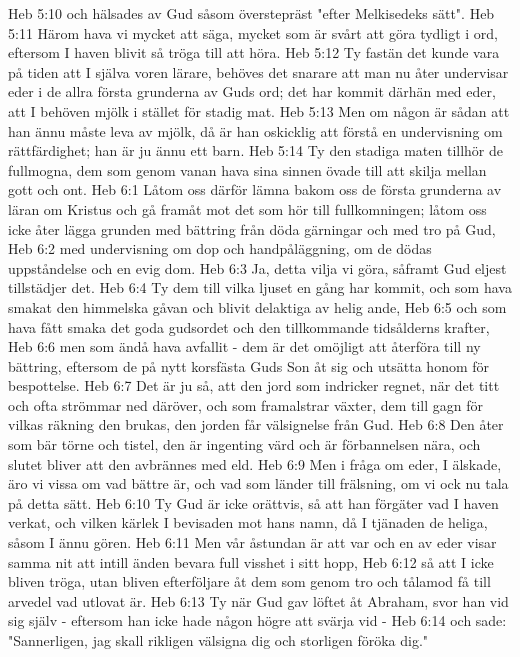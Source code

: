 Heb 5:10  och hälsades av Gud såsom överstepräst "efter Melkisedeks sätt".
Heb 5:11  Härom hava vi mycket att säga, mycket som är svårt att göra tydligt i ord, eftersom I haven blivit så tröga till att höra.
Heb 5:12  Ty fastän det kunde vara på tiden att I själva voren lärare, behöves det snarare att man nu åter undervisar eder i de allra första grunderna av Guds ord; det har kommit därhän med eder, att I behöven mjölk i stället för stadig mat.
Heb 5:13  Men om någon är sådan att han ännu måste leva av mjölk, då är han oskicklig att förstå en undervisning om rättfärdighet; han är ju ännu ett barn.
Heb 5:14  Ty den stadiga maten tillhör de fullmogna, dem som genom vanan hava sina sinnen övade till att skilja mellan gott och ont.
Heb 6:1  Låtom oss därför lämna bakom oss de första grunderna av läran om Kristus och gå framåt mot det som hör till fullkomningen; låtom oss icke åter lägga grunden med bättring från döda gärningar och med tro på Gud,
Heb 6:2  med undervisning om dop och handpåläggning, om de dödas uppståndelse och en evig dom.
Heb 6:3  Ja, detta vilja vi göra, såframt Gud eljest tillstädjer det.
Heb 6:4  Ty dem till vilka ljuset en gång har kommit, och som hava smakat den himmelska gåvan och blivit delaktiga av helig ande,
Heb 6:5  och som hava fått smaka det goda gudsordet och den tillkommande tidsålderns krafter,
Heb 6:6  men som ändå hava avfallit - dem är det omöjligt att återföra till ny bättring, eftersom de på nytt korsfästa Guds Son åt sig och utsätta honom för bespottelse.
Heb 6:7  Det är ju så, att den jord som indricker regnet, när det titt och ofta strömmar ned däröver, och som framalstrar växter, dem till gagn för vilkas räkning den brukas, den jorden får välsignelse från Gud.
Heb 6:8  Den åter som bär törne och tistel, den är ingenting värd och är förbannelsen nära, och slutet bliver att den avbrännes med eld.
Heb 6:9  Men i fråga om eder, I älskade, äro vi vissa om vad bättre är, och vad som länder till frälsning, om vi ock nu tala på detta sätt.
Heb 6:10  Ty Gud är icke orättvis, så att han förgäter vad I haven verkat, och vilken kärlek I bevisaden mot hans namn, då I tjänaden de heliga, såsom I ännu gören.
Heb 6:11  Men vår åstundan är att var och en av eder visar samma nit att intill änden bevara full visshet i sitt hopp,
Heb 6:12  så att I icke bliven tröga, utan bliven efterföljare åt dem som genom tro och tålamod få till arvedel vad utlovat är.
Heb 6:13  Ty när Gud gav löftet åt Abraham, svor han vid sig själv - eftersom han icke hade någon högre att svärja vid -
Heb 6:14  och sade: "Sannerligen, jag skall rikligen välsigna dig och storligen föröka dig."
